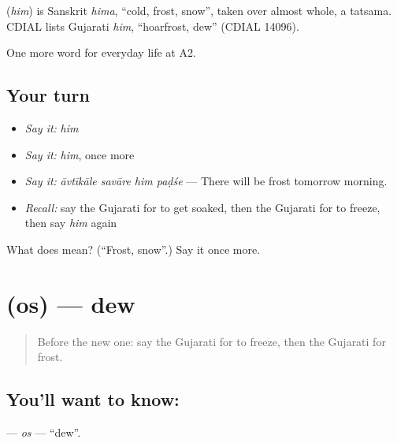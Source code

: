 \begin{cousinweb}
\textbf{} (\emph{him}) is Sanskrit \emph{hima}, \textquotedblleft{}cold, frost, snow\textquotedblright{}, taken over almost whole, a tatsama. CDIAL lists Gujarati \emph{him}, \textquotedblleft{}hoarfrost, dew\textquotedblright{} (CDIAL 14096).
\end{cousinweb}

\begin{grammarlens}[title={What you've built}]
One more word for everyday life at A2.
\end{grammarlens}

\subsection*{Your turn}
\begin{itemize}
\raggedright
  \item \emph{Say it:} \emph{him}
  \item \emph{Say it:} \emph{him}, once more
  \item \emph{Say it:} \emph{āvtīkāle savāre him paḍśe} — There will be frost tomorrow morning.
  \item \emph{Recall:} say the Gujarati for to get soaked, then the Gujarati for to freeze, then say \emph{him} again
\end{itemize}

\begin{tcolorbox}[breakable,colback=teal!4,colframe=teal!35!black,title={Before you move on}]
What does  mean? (\textquotedblleft{}Frost, snow\textquotedblright{}.) Say it once more.
\end{tcolorbox}
\section[\texorpdfstring{\gu{ઓસ} (os)}{ઓસ (os)}]{ (os) — dew}

\label{lesson:GU-C215-os}



\begin{quote}
Before the new one: say the Gujarati for to freeze, then the Gujarati for frost.
\end{quote}

\subsection*{You'll want to know: }
\textbf{} — \emph{os} — \textquotedblleft{}dew\textquotedblright{}.

